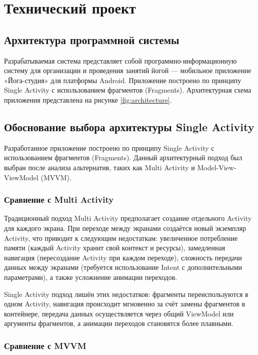 \section{Технический проект}

\subsection{Архитектура программной системы}

Разрабатываемая система представляет собой программно-информационную систему для организации и проведения занятий йогой — мобильное приложение «Йога-студия» для платформы Android. Приложение построено по принципу Single Activity с использованием фрагментов (Fragments). Архитектурная схема приложения представлена на рисунке \ref{fig:architecture}.

\subsection{Обоснование выбора архитектуры Single Activity}

Разработанное приложение построено по принципу Single Activity с использованием фрагментов (Fragments). Данный архитектурный подход был выбран после анализа альтернатив, таких как Multi Activity и Model-View-ViewModel (MVVM).

\subsubsection{Сравнение с Multi Activity}

Традиционный подход Multi Activity предполагает создание отдельного Activity для каждого экрана. При переходе между экранами создаётся новый экземпляр Activity, что приводит к следующим недостаткам: увеличенное потребление памяти (каждый Activity хранит свой контекст и ресурсы), замедленная навигация (пересоздание Activity при каждом переходе), сложность передачи данных между экранами (требуется использование Intent с дополнительными параметрами), а также усложнение анимации переходов.

Single Activity подход лишён этих недостатков: фрагменты переиспользуются в одном Activity, навигация происходит мгновенно за счёт замены фрагментов в контейнере, передача данных осуществляется через общий ViewModel или аргументы фрагментов, а анимации переходов становятся более плавными.

\subsubsection{Сравнение с MVVM}

